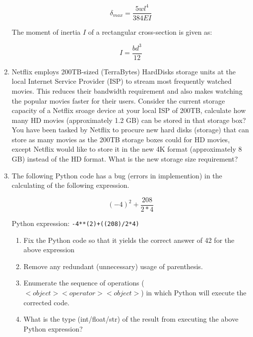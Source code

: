 \documentclass[a4paper,12pt]{article}
\begin{document}
\begin{enumerate}
	\begin{equation*}
		\delta_{max} = \frac{5wl^4}{384EI}
	\end{equation*}
	
	The moment of inertia $I$ of a rectangular cross-section is given as:
	
	\begin{equation}
		I = \frac{b d^3}{12}
	\end{equation}
	
	
	\item Netflix employs 200TB-sized (TerraBytes) HardDisks storage units at the local Internet Service Provider (ISP) to stream most frequently watched movies. This reduces their bandwidth requirement and also makes watching the popular movies faster for their users. Consider the current storage capacity of a Netflix sroage device at your local ISP of 200TB, calculate how many HD movies (approximately 1.2 GB) can be stored in that storage box? You have been tasked by Netflix to procure new hard disks (storage) that can store as many movies as the 200TB storage boxes could for HD movies, except Netflix would like to store it in the new 4K format (approximately 8 GB) instead of the HD format. What is the new storage size requirement?
	
	\item The following Python code has a bug (errors in implemention) in the calculating of the following expression.
		
	\begin{equation*}
	(-4)^2 + \frac{208}{2 * 4}
	\end{equation*}

	Python expression: \verb|-4**(2)+((208)/2*4)|
	
	\begin{enumerate}
		\item Fix the Python code so that it yields the correct answer of 42 for the above expression
		
		\item Remove any redundant (unnecessary) usage of parenthesis. 
		
		\item Enumerate the sequence of operations ($<object><operator><object>$) in which Python will execute the corrected code.
		
		\item What is the type (int/float/str) of the result from executing the above Python expression?
	\end{enumerate}
\end{enumerate}
\end{document}
